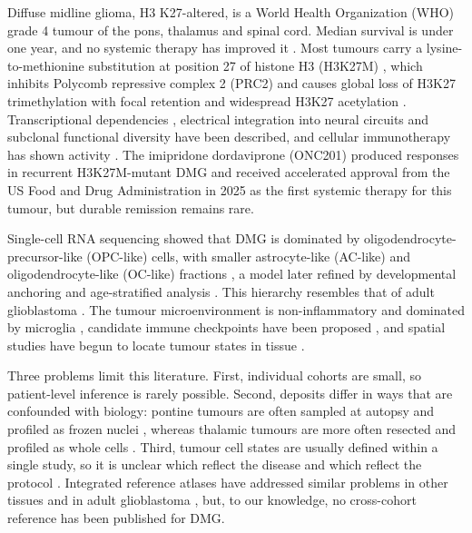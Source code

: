 \documentclass[11pt,a4paper]{article}
\begin{document}
Diffuse midline glioma, H3 K27-altered, is a World Health Organization (WHO) grade 4 tumour of the pons, thalamus and
spinal cord. Median survival is under one year, and no systemic therapy has improved it
\citep{louis2021who,mackay2017integrated,hoffman2018clinical}. Most tumours carry a lysine-to-methionine substitution at
position 27 of histone H3 (H3K27M) \citep{schwartzentruber2012driver,wu2012somatic}, which inhibits Polycomb repressive
complex 2 (PRC2) and causes global loss of H3K27 trimethylation with focal retention and widespread H3K27 acetylation
\citep{lewis2013inhibition,bender2013reduced,harutyunyan2019hkm,krug2019pervasive}. Transcriptional dependencies
\citep{nagaraja2017transcriptional}, electrical integration into neural circuits \citep{venkatesh2019electrical} and
subclonal functional diversity \citep{vinci2018functional} have been described, and cellular
immunotherapy has shown activity \citep{majzner2022gdcar}. The imipridone dordaviprone (ONC201) produced responses in
recurrent H3K27M-mutant DMG \citep{arrillagaromany2024onc} and received accelerated approval from the US Food and Drug
Administration in 2025 as the first systemic therapy for this tumour, but durable remission remains rare.

Single-cell RNA sequencing showed that DMG is dominated by oligodendrocyte-precursor-like (OPC-like) cells, with smaller
astrocyte-like (AC-like) and oligodendrocyte-like (OC-like) fractions \citep{filbin2018developmental}, a model later
refined by developmental anchoring \citep{jessa2022km,jessa2019stalled} and age-stratified analysis
\citep{liu2022landscape}. This hierarchy resembles that of adult glioblastoma \citep{patel2014singlecell,neftel2019integrative}.
The tumour microenvironment is non-inflammatory and dominated by microglia \citep{lin2018noninflammatory,ross2024microglia},
candidate immune checkpoints have been proposed \citep{collot2026igsfvista}, and spatial studies have begun to locate
tumour states in tissue \citep{ren2023spatial,huchede2024bmp}.

Three problems limit this literature. First, individual cohorts are small, so patient-level inference is rarely
possible. Second, deposits differ in ways that are confounded with biology: pontine tumours are often sampled at autopsy
and profiled as frozen nuclei \citep{okada2026singlenucleus}, whereas thalamic tumours are more often resected and
profiled as whole cells \citep{desisto2024tumor}. Third, tumour cell states are usually defined within a single study,
so it is unclear which reflect the disease and which reflect the protocol \citep{gavish2023hallmarks}. Integrated
reference atlases have addressed similar problems in other tissues and in adult glioblastoma
\citep{sikkema2023integrated,ruizmoreno2025gbmap}, but, to our knowledge, no cross-cohort reference has been
published for DMG.
\end{document}
